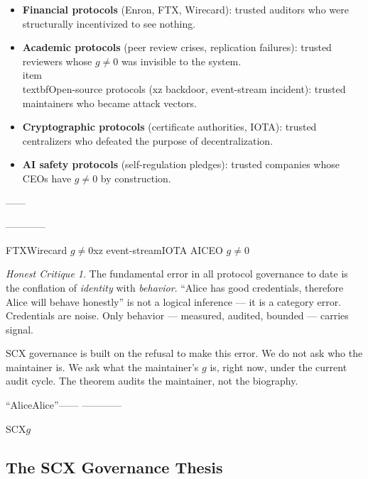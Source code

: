 \documentclass[12pt,a4paper]{article}
\theoremstyle{remark}
\newtheorem{honesthit}{Honest Critique}[section]
\newenvironment{hitbox}{%
  \begin{center}
  \color{red}
  \begin{minipage}{0.92\textwidth}
  \begin{honesthit}
}{%
  \end{honesthit}
  \end{minipage}
  \end{center}
}
\begin{document}
\begin{itemize}[leftmargin=*]
    \item \textbf{Financial protocols} (Enron, FTX, Wirecard): trusted auditors
          who were structurally incentivized to see nothing.
    \item \textbf{Academic protocols} (peer review crises, replication failures):
          trusted reviewers whose $g \neq 0$ was invisible to the system.
    \\item \\textbf{Open-source protocols} (xz backdoor, event-stream incident):
          trusted maintainers who became attack vectors.
    \item \textbf{Cryptographic protocols} (certificate authorities, IOTA):
          trusted centralizers who defeated the purpose of decentralization.
    \item \textbf{AI safety protocols} (self-regulation pledges): trusted
          companies whose CEOs have $g \neq 0$ by construction.
\end{itemize}

\medskip
\noindent\textbf{}
——


————


FTXWirecard
$g \neq 0$xz
event-streamIOTA
AICEO
$g \neq 0$

\begin{hitbox}
The fundamental error in all protocol governance to date is the conflation of
\textit{identity} with \textit{behavior}. ``Alice has good credentials, therefore
Alice will behave honestly'' is not a logical inference — it is a category error.
Credentials are noise. Only behavior — measured, audited, bounded — carries
signal.

SCX governance is built on the refusal to make this error. We do not ask who the
maintainer is. We ask what the maintainer's $g$ is, right now, under the current
audit cycle. The theorem audits the maintainer, not the biography.

\begin{center}
\small\textbf{}
\textit{}\textit{}
“AliceAlice”——
————

SCX$g$

\end{center}
\end{hitbox}

\subsection{The SCX Governance Thesis}
\end{document}
